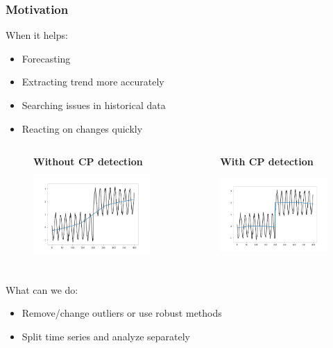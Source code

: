 \documentclass[intlimits, 9pt, unicode]{beamer}
\begin{document}
\begin{frame}
    \frametitle{Motivation}
When it helps:
    \begin{itemize}
    	\item Forecasting
	\item Extracting trend more accurately
    	\item Searching issues in historical data 
	\item Reacting on changes quickly
    \end{itemize}
   
   
   \begin{columns}
        \begin{column}{5cm}
	\begin{figure}
		\textbf{Without CP detection}
		\includegraphics[height=3.5cm]{images/trend_fallacy}
	\end{figure}
        \end{column}
        
        \begin{column}{5cm}
	\begin{figure}
		\textbf{With CP detection}
		\includegraphics[height=3.5cm]{images/trend_succeed}
	\end{figure}
        \end{column}
    \end{columns}
    
What can we do:
    \begin{itemize}
    	\item Remove/change outliers or use robust methods
	\item Split time series and analyze separately
    \end{itemize}

\end{frame}
\end{document}
